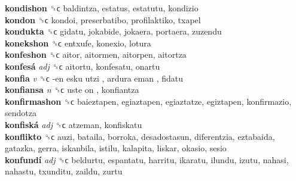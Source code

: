 \textbf{kondishon} ␝ϲ  baldintza, estatus, estatutu, kondizio  \\
\textbf{kondon} ␝ϲ  kondoi, preserbatibo, profilaktiko, txapel  \\
\textbf{kondukta} ␝ϲ  gidatu, jokabide, jokaera, portaera, zuzendu  \\
\textbf{konekshon} ␝ϲ  entxufe, konexio, lotura  \\
\textbf{konfeshon} ␝ϲ  aitor, aitormen, aitorpen, aitortza  \\
\textbf{konfesá} \emph{adj}  ␝ϲ  aitortu, konfesatu, onartu  \\
\textbf{konfia} \emph{v}  ␝ϲ   -en esku utzi ,  ardura eman , fidatu  \\
\textbf{konfiansa} \emph{n}  ␝ϲ   uste on , konfiantza  \\
\textbf{konfirmashon} ␝ϲ  baieztapen, egiaztapen, egiaztatze, egiztapen, konfirmazio, sendotza  \\
\textbf{konfiská} \emph{adj}  ␝ϲ  atzeman, konfiskatu  \\
\textbf{konflikto} ␝ϲ  auzi, bataila, borroka, desadostasun, diferentzia, eztabaida, gatazka, gerra, iskanbila, istilu, kalapita, liskar, okasio, sesio  \\
\textbf{konfundí} \emph{adj}  ␝ϲ  beldurtu, espantatu, harritu, ikaratu, ilundu, izutu, nahasi, nahastu, txunditu, zaildu, zurtu  \\
